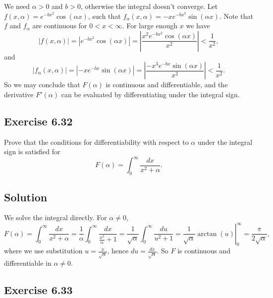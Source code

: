 We need $\alpha > 0$ and $b > 0$, otherwise the integral doesn't converge.
Let $f(x, \alpha) = e^{-bx^2} \cos(\alpha x)$, such that $f_{\alpha}(x, \alpha) = -x e^{-bx^2} \sin(\alpha x)$.
Note that $f$ and $f_{\alpha}$ are continuous for $0 < x < \infty$.
For large enough $x$ we have
\begin{equation*}
    |f(x, \alpha)| = |e^{-b x^2} \cos(\alpha x)| = \left| \frac{x^2 e^{-b x^2} \cos(\alpha x)}{x^2} \right| < \frac{1}{x^2},
\end{equation*}
and
\begin{equation*}
    |f_{\alpha}(x, \alpha)| = |-x e^{-b x} \sin(\alpha x)| = \left| \frac{-x^3 e^{-b x} \sin(\alpha x)}{x^2} \right| < \frac{1}{x^2}.
\end{equation*}
So we may conclude that $F(\alpha)$ is continuous and differentiable, and the derivative $F'(\alpha)$ can be evaluated by differentiating under the integral sign.


\subsection*{Exercise 6.32}

Prove that the conditions for differentiability with respect to $\alpha$ under the integral sign is satisfied for
\begin{equation*}
    F(\alpha) = \int_{0}^{\infty} \frac{dx}{x^2 + \alpha}.
\end{equation*}

\subsection*{Solution}

We solve the integral directly.
For $\alpha \neq 0$,
\begin{equation*}
    F(\alpha) = \int_0^{\infty} \frac{dx}{x^2 + \alpha}
        = \frac{1}{\alpha} \int_0^{\infty} \frac{dx}{\frac{x^2}{\alpha} + 1}
        = \frac{1}{\sqrt{\alpha}} \int_0^{\infty} \frac{du}{u^2 + 1}
        = \left. \frac{1}{\sqrt{\alpha}} \arctan(u) \right|_0^{\infty}
        = \frac{\pi}{2 \sqrt{\alpha}},
\end{equation*}
where we use substitution $u = \frac{x}{\sqrt{\alpha}}$, hence $du = \frac{dx}{\sqrt{\alpha}}$.
So $F$ is continuous and differentiable in $\alpha \neq 0$.


\subsection*{Exercise 6.33}

